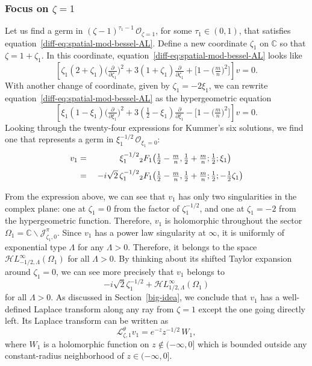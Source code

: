 \documentclass{article}
\newcommand{\singexp}[2]{\mathcal{H}L^\infty_{#1, #2}}
\newcommand{\C}{\mathbb{C}}
\newcommand{\laplace}{\mathcal{L}}
\theoremstyle{definition}
\theoremstyle{plain}
\begin{document}
\subsubsection{Focus on $\zeta = 1$}\label{pos-root-AL}
%
Let us find a germ in $(\zeta-1)^{\tau_1-1}\,\mathcal{O}_{\zeta=1}$, for some $\tau_1 \in (0, 1)$, that satisfies equation~\eqref{diff-eq:spatial-mod-bessel-AL}. Define a new coordinate $\zeta_1$ on $\C$ so that $\zeta = 1 + \zeta_1$. In this coordinate, equation~\eqref{diff-eq:spatial-mod-bessel-AL} looks like
\begin{equation}\label{diff-eq:spatial-mod-bessel-pos-AL}
\left[\zeta_1(2 + \zeta_1) \big(\tfrac{\partial}{\partial \zeta_1}\big)^2 + 3(1 + \zeta_1) \tfrac{\partial}{\partial \zeta_1} + \big[1 - \big(\tfrac{m}{n}\big)^2\big]\right] v = 0.
\end{equation}
With another change of coordinate, given by $\zeta_1 = -2\xi_1$, we can rewrite equation~\eqref{diff-eq:spatial-mod-bessel-AL} as the hypergeometric equation
\begin{equation}\label{diff-eq:hypergeom-pos-AL}
\left[\xi_1 (1 - \xi_1) \big(\tfrac{\partial}{\partial \xi_1}\big)^2 + 3(\tfrac{1}{2} - \xi_1) \tfrac{\partial}{\partial \xi_1} - \big[1 - \big(\tfrac{m}{n}\big)^2\big]\right] v = 0.
\end{equation}
Looking through the twenty-four expressions for Kummer's six solutions, we find one \cite[formula~15.10.12]{dlmf} that represents a germ in $\xi_1^{-1/2}\,\mathcal{O}_{\xi_1=0}$:
\begin{alignat*}{2}
v_1 &=\;& \hphantom{-i\sqrt{2}}\,\xi_1^{-1/2} & {}_2F_1\big(\tfrac{1}{2}-\tfrac{m}{n}, \tfrac{1}{2}+\tfrac{m}{n}; \tfrac{1}{2}; \xi_1\big) \\[1mm]
&=\;& -i\sqrt{2}\,\zeta_1^{-1/2} & {}_2F_1\big(\tfrac{1}{2}-\tfrac{m}{n}, \tfrac{1}{2}+\tfrac{m}{n}; \tfrac{1}{2}; -\tfrac{1}{2}\zeta_1\big)
\end{alignat*}

From the expression above, we can see that $v_1$ has only two singularities in the complex plane: one at $\zeta_1 = 0$ from the factor of $\zeta_1^{-1/2}$, and one at $\zeta_1 = -2$ from the hypergeometric function. Therefore, $v_1$ is holomorphic throughout the sector $\Omega_1 = \C \smallsetminus \mathcal{J}^\pi_{\zeta_1, 0}$. Since $v_1$ has a power law singularity at $\infty$, it is uniformly of exponential type $\Lambda$ for any $\Lambda > 0$. Therefore, it belongs to the space $\singexp{-1/2}{\Lambda}(\Omega_1)$ for all $\Lambda > 0$. By thinking about its shifted Taylor expansion around $\zeta_1 = 0$, we can see more precisely that $v_1$ belongs to
\[ -i\sqrt{2}\zeta_1^{-1/2} + \singexp{1/2}{\Lambda}(\Omega_1) \]
for all $\Lambda > 0$. As discussed in Section~\ref{big-idea}, we conclude that $v_1$ has a well-defined Laplace transform along any ray from $\zeta = 1$ except the one going directly left. Its Laplace transform can be written as
\[ \laplace^\theta_{\zeta, 1} v_1 = e^{-z} z^{-1/2}\,W_1, \]
where $W_1$ is a holomorphic function on $z \notin (-\infty, 0]$ which is bounded outside any constant-radius neighborhood of $z \in (-\infty, 0]$.
%
\end{document}
